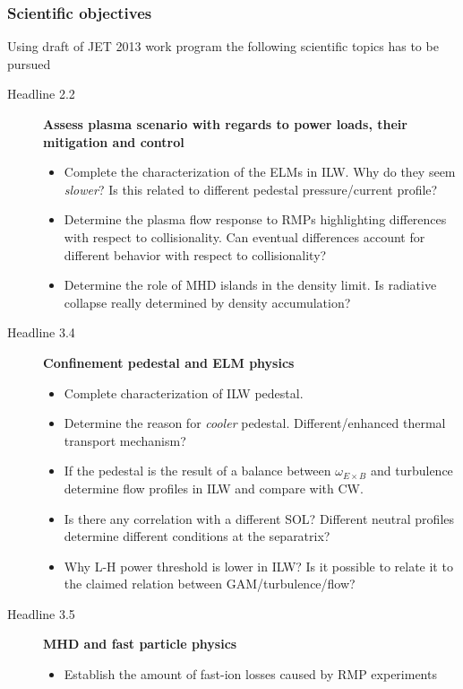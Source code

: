 \documentclass[t,10pt]{beamer}
\begin{document}
\begin{frame}[allowframebreaks]
  \frametitle{Scientific objectives}
  Using draft of JET 2013 work program the following scientific topics
  has to be pursued
  \begin{description}
  \item[Headline 2.2] \textbf{Assess plasma scenario with regards to
      power loads, their mitigation and control}
    \begin{itemize}
    \item Complete the characterization of the ELMs in ILW. Why do they
      seem \emph{slower}? Is this related to different pedestal
      pressure/current profile?
    \item Determine the plasma flow response to RMPs highlighting
      differences with respect to collisionality. Can eventual differences account for different behavior with respect to
      collisionality?
    \item Determine the role of MHD islands in the density limit. Is
      radiative collapse really determined by density accumulation?
    \end{itemize}
  \item[Headline 3.4] \textbf{Confinement pedestal and ELM physics}
    \begin{itemize}
    \item Complete characterization of ILW pedestal.
    \item Determine the
      reason for \emph{cooler} pedestal. Different/enhanced thermal
      transport mechanism?
    \item If the pedestal is the result of a balance between
      $\omega_{E\times B}$ and turbulence determine flow profiles in
      ILW and compare with CW.
    \item Is there any correlation with a different SOL? Different
      neutral profiles determine different conditions at the separatrix?
    \item Why L-H power threshold is lower in ILW? Is it possible to
      relate it to the claimed relation between GAM/turbulence/flow? 
    \end{itemize}
  \item[Headline 3.5] \textbf{MHD and fast particle physics}
    \begin{itemize}
    \item Establish the amount of fast-ion losses caused by RMP
      experiments
    \end{itemize}
  \end{description}
\end{frame}
\end{document}
